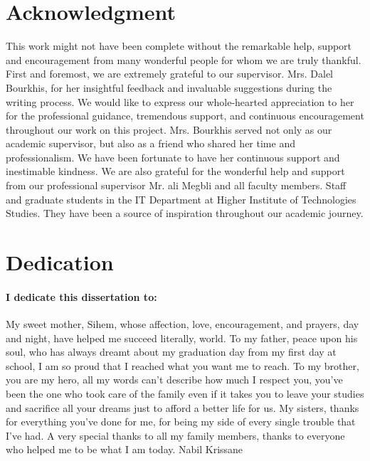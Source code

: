 \documentclass[12pt]{report}
\begin{document}
\newcommand{\SubItem}[1]{
    {\setlength\itemindent{15pt} \item[-] #1}
}



\renewcommand{\contentsname}{Table of contents}

\renewcommand{\cftsecleader}{\cftdotfill{\cftdotsep}}

\section*{\centering Acknowledgment}
This work might not have been complete without the remarkable help, support and encouragement from many wonderful people for whom we are truly thankful.
First and foremost, we are extremely grateful to our supervisor.
Mrs. Dalel Bourkhis, for her insightful feedback and invaluable suggestions during the writing
process. We would like to express our whole-hearted appreciation to her for the professional guidance, tremendous support, and continuous encouragement throughout our work on this project.
Mrs. Bourkhis served not only as our academic supervisor, but also as a friend
who shared her time and professionalism. We have been fortunate to have her continuous support and inestimable kindness.
We are also grateful for the wonderful help and support from our professional supervisor Mr. ali Megbli and all faculty members.
Staff and graduate students in the IT Department at Higher Institute of Technologies Studies. They have been a source of inspiration throughout our academic journey.
\pagebreak

\section*{\centering Dedication}
\paragraph{\normalfont I dedicate this dissertation to:\newline}
My sweet mother, Sihem, whose affection, love, encouragement, and prayers, day and night, have helped me succeed literally, world.
To my father, peace upon his soul, who has always dreamt about my graduation day from my first day at school, I am so proud that I reached what you want me to reach.
To my brother, you are my hero, all my words can’t describe how much I respect you, you’ve been the one who took care of the family even if it takes you to leave your studies and sacrifice all your dreams just to afford a better life for us.
My sisters, thanks for everything you’ve done for me, for being my side of every single trouble that I’ve had.
A very special thanks to all my family members, thanks to everyone who helped me to be what I am today. {\tiny Nabil Krissane}
\end{document}
